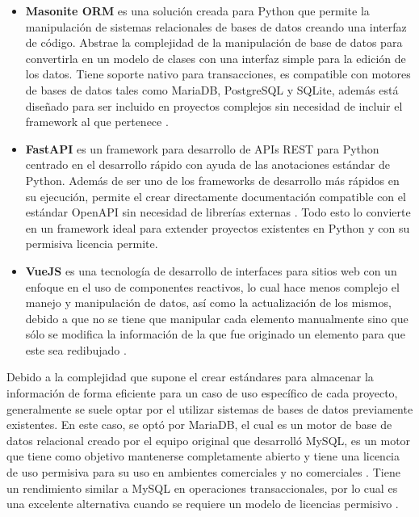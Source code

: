 \begin{itemize}
   \item \textbf{Masonite ORM} es una solución creada para Python que permite la manipulación de sistemas relacionales de bases de datos creando una interfaz de código. Abstrae la complejidad de la manipulación de base de datos para convertirla en un modelo de clases con una interfaz simple para la edición de los datos. Tiene soporte nativo para transacciones, es compatible con motores de bases de datos tales como MariaDB, PostgreSQL y SQLite, además está diseñado para ser incluido en proyectos complejos sin necesidad de incluir el framework al que pertenece \cite{masonite_2021}.
   \item \textbf{FastAPI} es un framework para desarrollo de APIs REST para Python centrado en el desarrollo rápido con ayuda de las anotaciones estándar de Python. Además de ser uno de los frameworks de desarrollo más rápidos en su ejecución, permite el crear directamente documentación compatible con el estándar OpenAPI sin necesidad de librerías externas \cite{fastapi_ramirez_2020}. Todo esto lo convierte en un framework ideal para extender proyectos existentes en Python y con su permisiva licencia permite.
   \item \textbf{VueJS} es una tecnología de desarrollo de interfaces para sitios web con un enfoque en el uso de componentes reactivos, lo cual hace menos complejo el manejo y manipulación de datos, así como la actualización de los mismos, debido a que no se tiene que manipular cada elemento manualmente sino que sólo se modifica la información de la que fue originado un elemento para que este sea redibujado \cite{vuejs_up}.
\end{itemize}

Debido a la complejidad que supone el crear estándares para almacenar la información de forma eficiente para un caso de uso específico de cada proyecto, generalmente se suele optar por el utilizar sistemas de bases de datos previamente existentes. En este caso, se optó por MariaDB, el cual es un motor de base de datos relacional creado por el equipo original que desarrolló MySQL, es un motor que tiene como objetivo mantenerse completamente abierto y tiene una licencia de uso permisiva para su uso en ambientes comerciales y no comerciales \cite{mariadb_foundation_2019}. Tiene un rendimiento similar a MySQL en operaciones transaccionales, por lo cual es una excelente alternativa cuando se requiere un modelo de licencias permisivo \cite{mariadb_comparison}.

